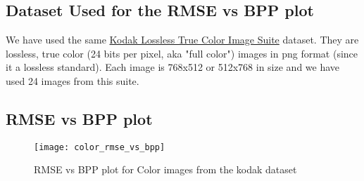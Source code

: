 \documentclass[12pt, a4paper]{report}
\begin{document}
	\subsection{Dataset Used for the RMSE vs BPP plot}
	We have used the same \href{https://r0k.us/graphics/kodak/}{Kodak Lossless True Color Image Suite} dataset. They are lossless, true color (24 bits per pixel, aka "full color") images in png format (since it a lossless standard). Each image is 768x512 or 512x768 in size and we have used 24 images from this suite.
	\subsection{RMSE vs BPP plot}
	\begin{figure}[H]
		\centering
		\texttt{[image: color\_rmse\_vs\_bpp]}
		\caption{RMSE vs BPP plot for Color images from the kodak dataset}
	\end{figure}
	
	
\end{document}
